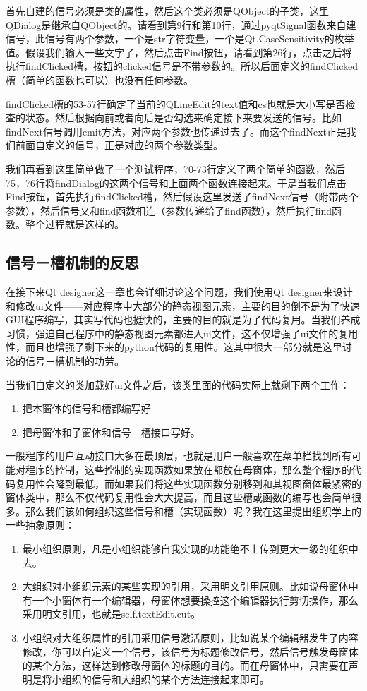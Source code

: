 \documentclass[11pt,oneside]{article}
\begin{document}
首先自建的信号必须是类的属性，然后这个类必须是QObject的子类，这里QDialog是继承自QObject的。请看到第9行和第10行，通过pyqtSignal函数来自建信号，此信号有两个参数，一个是str字符变量，一个是Qt.CaseSensitivity的枚举值。假设我们输入一些文字了，然后点击Find按钮，请看到第26行，点击之后将执行findClicked槽，按钮的clicked信号是不带参数的。所以后面定义的findClicked槽（简单的函数也可以）也没有任何参数。

findClicked槽的53-57行确定了当前的QLineEdit的text值和cs也就是大小写是否检查的状态。然后根据向前或者向后是否勾选来确定接下来要发送的信号。比如findNext信号调用emit方法，对应两个参数也传递过去了。而这个findNext正是我们前面自定义的信号，正是对应的两个参数类型。

我们再看到这里简单做了一个测试程序，70-73行定义了两个简单的函数，然后75，76行将findDialog的这两个信号和上面两个函数连接起来。于是当我们点击Find按钮，首先执行findClicked槽，然后假设这里发送了findNext信号（附带两个参数），然后信号又和find函数相连（参数传递给了find函数），然后执行find函数。整个过程就是这样的。


\subsection{信号－槽机制的反思}
\label{sec:orgheadline22}
在接下来Qt designer这一章也会详细讨论这个问题，我们使用Qt designer来设计和修改ui文件——对应程序中大部分的静态视图元素，主要的目的倒不是为了快速GUI程序编写，其实写代码也挺快的，主要的目的就是为了代码复用。当我们养成习惯，强迫自己程序中的静态视图元素都进入ui文件，这不仅增强了ui文件的复用性，而且也增强了剩下来的python代码的复用性。这其中很大一部分就是这里讨论的信号－槽机制的功劳。

当我们自定义的类加载好ui文件之后，该类里面的代码实际上就剩下两个工作：
\begin{enumerate}
\item 把本窗体的信号和槽都编写好
\item 把母窗体和子窗体和信号－槽接口写好。
\end{enumerate}

一般程序的用户互动接口大多在最顶层，也就是用户一般喜欢在菜单栏找到所有可能对程序的控制，这些控制的实现函数如果放在都放在母窗体，那么整个程序的代码复用性会降到最低，而如果我们将这些实现函数分别移到和其视图窗体最紧密的窗体类中，那么不仅代码复用性会大大提高，而且这些槽或函数的编写也会简单很多。那么我们该如何组织这些信号和槽（实现函数）呢？我在这里提出组织学上的一些抽象原则：
\begin{enumerate}
\item 最小组织原则，凡是小组织能够自我实现的功能绝不上传到更大一级的组织中去。
\item 大组织对小组织元素的某些实现的引用，采用明文引用原则。比如说母窗体中有一个小窗体有一个编辑器，母窗体想要操控这个编辑器执行剪切操作，那么采用明文引用，也就是self.textEdit.cut。
\item 小组织对大组织属性的引用采用信号激活原则，比如说某个编辑器发生了内容修改，你可以自定义一个信号，该信号为标题修改信号，然后信号触发母窗体的某个方法，这样达到修改母窗体的标题的目的。而在母窗体中，只需要在声明是将小组织的信号和大组织的某个方法连接起来即可。
\end{enumerate}
\end{document}
